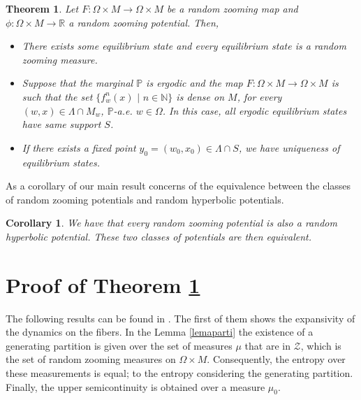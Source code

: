 \documentclass[12pt,a4paper]{amsart}
\theoremstyle{plain}
\newtheorem{corollary}{Corollary}
\newtheorem{theorema}{Theorem}
\begin{document}
	\begin{theorema}
		\label{A}
		Let $F:\Omega \times M \to \Omega \times M$ be a random zooming map and $\phi : \Omega \times M \to \mathbb{R}$ a random zooming potential. Then,
		
		\begin{itemize}
			\item There exists some equilibrium state and every equilibrium state is a random zooming measure.
			
			\item Suppose that the marginal $\mathbb{P}$ is ergodic and the map $F : \Omega \times M \to \Omega \times M$ is such that the set $\{f^{n}_{w}(x) \,\, | \,\, n \in \mathbb{N}\}$ is dense on $M$, for every $(w,x) \in \Lambda \cap M_{w}$,  $\mathbb{P}$-a.e. $w \in \Omega$. In this case, all ergodic equilibrium states have same support $S$.
			
			\item If there exists a fixed point $y_{0} = (w_{0}, x_{0}) \in \Lambda \cap S$, we have uniqueness of equilibrium states.
		\end{itemize}
	\end{theorema}
	
	As a corollary of our main result concerns of the equivalence between the classes of random zooming potentials and random hyperbolic potentials.
	
	\begin{corollary}\label{B}
		We have that every random zooming potential is also a random hyperbolic potential. These two classes of potentials are then equivalent.
	\end{corollary}
	
	\section{Proof of Theorem \ref{A}}
	The following results can be found in  \cite{AMO}. The first of them shows the expansivity of the dynamics on the fibers. In the Lemma \ref{lemaparti} the existence of a generating partition is given over the set of measures $\mu$ that are in  $\mathcal{Z}$, which is the set of random zooming measures on $\Omega \times  M$. Consequently, the entropy over these measurements is equal; to the entropy considering the generating partition. Finally, the upper semicontinuity is obtained over a measure $\mu_0$.
	
\end{document}
